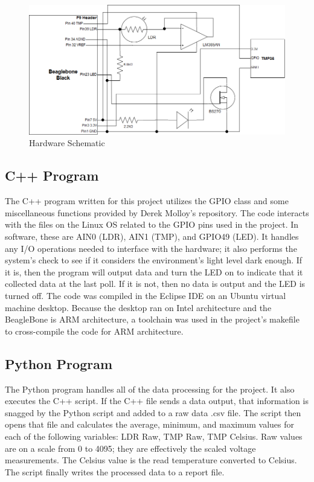 \documentclass[12pt]{article}
\begin{document}
\begin{figure}[H]
\begin{center}
\includegraphics[scale=0.4]{Hardware_Schematic.png}
\caption{Hardware Schematic}
\label{fig:HWSchematic}
\end{center}
\end{figure}

\newpage

\subsection{C++ Program}
The C++ program written for this project utilizes the GPIO class and some miscellaneous functions provided by Derek Molloy's repository.  The code interacts with the files on the Linux OS related to the GPIO pins used in the project.  In software, these are AIN0 (LDR), AIN1 (TMP), and GPIO49 (LED).  It handles any I/O operations needed to interface with the hardware; it also performs the system's check to see if it considers the environment's light level dark enough.  If it is, then the program will output data and turn the LED on to indicate that it collected data at the last poll.  If it is not, then no data is output and the LED is turned off.  The code was compiled in the Eclipse IDE on an Ubuntu virtual machine desktop.  Because the desktop ran on Intel architecture and the BeagleBone is ARM architecture, a toolchain was used in the project's makefile to cross-compile the code for ARM architecture.

\subsection{Python Program}
The Python program handles all of the data processing for the project.    It also executes the C++ script.  If the C++ file sends a data output, that information is snagged by the Python script and added to a raw data .csv file.  The script then opens that file and calculates the average, minimum, and maximum values for each of the following variables: LDR Raw, TMP Raw, TMP Celsius.  Raw values are on a scale from 0 to 4095; they are effectively the scaled voltage measurements.  The Celsius value is the read temperature converted to Celsius.  The script finally writes the processed data to a report file.
\end{document}
